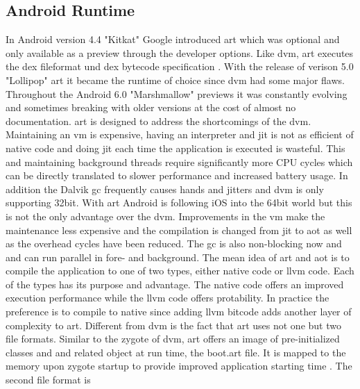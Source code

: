 \subsection{Android Runtime} \label{subsection:android-art}
In Android version 4.4 "Kitkat" Google introduced \gls{art} which was optional and only available as a preview through the developer options.
Like \gls{dvm}, \gls{art} executes the \gls{dex} fileformat und \gls{dex} bytecode specification \cite{androidArt}.
With the release of verison 5.0 "Lollipop" \gls{art} it became the runtime of choice since \gls{dvm} had some major flaws.
Throughout the Android 6.0 "Marshmallow" previews it was constantly evolving and sometimes breaking with older versions at the cost of almost no documentation.
\newline
\gls{art} is designed to address the shortcomings of the \gls{dvm}.
Maintaining an \gls{vm} is expensive, having an interpreter and \gls{jit} is not as efficient of native code and doing \gls{jit} each time the application is executed is wasteful.
This and maintaining background threads require significantly more CPU cycles which can be directly translated to slower performance and increased battery usage.
In addition the Dalvik \gls{gc} frequently causes hands and jitters and \gls{dvm} is only supporting 32bit.
With \gls{art} Android is following iOS into the 64bit world but this is not the only advantage over the \gls{dvm}.
Improvements in the \gls{vm} make the maintenance less expensive and the compilation is changed from \gls{jit} to \gls{aot} as well as the overhead cycles have been reduced.
The \gls{gc} is also non-blocking now and and can run parallel in fore- and background.
\newline
The mean idea of \gls{art} and \gls{aot} is to compile the application to one of two types, either native code or \gls{llvm} code.
Each of the types has its purpose and advantage.
The native code offers an improved execution performance while the \gls{llvm} code offers protability.
In practice the preference is to compile to native since adding \gls{llvm} bitcode adds another layer of complexity to \gls{art}.
\newline
Different from \gls{dvm} is the fact that \gls{art} uses not one but two file formats.
Similar to the zygote of \gls{dvm}, \gls{art} offers an image of pre-initialized classes and and related object at run time, the boot.art file.
It is mapped to the memory upon zygote startup to provide improved application starting time \cite{developersConfigureArt}.
The second file format is



